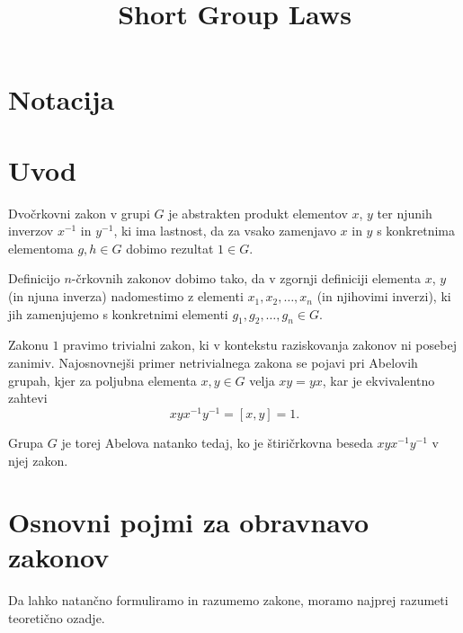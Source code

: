 \documentclass[mat1, tisk]{fmfdelo}
\title{Short Group Laws}
\numberwithin{equation}{section}  %
\begin{document}
\section{Notacija}

\section{Uvod}




Dvočrkovni zakon v grupi $G$ je abstrakten produkt elementov $x$, $y$ ter njunih inverzov $x^{-1}$ in $y^{-1}$, ki ima lastnost, da za vsako zamenjavo $x$ in $y$ s konkretnima
elementoma $g, h \in G$ dobimo rezultat $1 \in G$.

\begin{opomba}
Definicijo $n$-črkovnih zakonov dobimo tako, da v zgornji definiciji elementa $x$, $y$ (in njuna inverza) nadomestimo z elementi $x_1, x_2, \ldots, x_n$ (in njihovimi inverzi),
ki jih zamenjujemo s konkretnimi elementi $g_1, g_2, \ldots, g_{n} \in G$.
\end{opomba}


Zakonu $1$ pravimo trivialni zakon, ki v kontekstu raziskovanja zakonov ni posebej zanimiv. Najosnovnejši primer netrivialnega zakona se pojavi pri Abelovih grupah, kjer za poljubna elementa $x,y \in  G$ velja $xy = yx$, kar je ekvivalentno
zahtevi \begin{equation*}
xyx^{-1}y^{-1} = [x,y] = 1.
\end{equation*}

Grupa $G$ je torej Abelova natanko tedaj, ko je štiričrkovna beseda $xyx^{-1}y^{-1}$ v njej zakon. 


\section{Osnovni pojmi za obravnavo zakonov}

Da lahko natančno formuliramo in razumemo zakone, moramo najprej razumeti teoretično ozadje.
\end{document}

